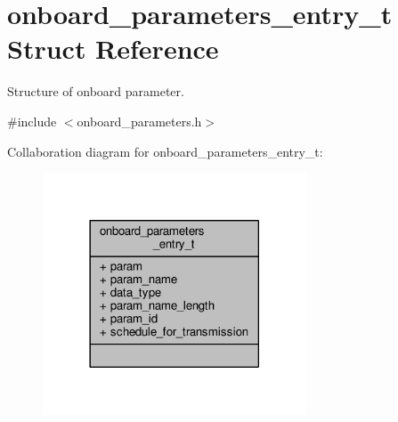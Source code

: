 \hypertarget{structonboard__parameters__entry__t}{\section{onboard\+\_\+parameters\+\_\+entry\+\_\+t Struct Reference}
\label{structonboard__parameters__entry__t}
}


Structure of onboard parameter.  




{\ttfamily \#include $<$onboard\+\_\+parameters.\+h$>$}



Collaboration diagram for onboard\+\_\+parameters\+\_\+entry\+\_\+t\+:
\nopagebreak
\begin{figure}[H]
\begin{center}
\leavevmode
\includegraphics[width=222pt]{structonboard__parameters__entry__t__coll__graph}
\end{center}
\end{figure}
